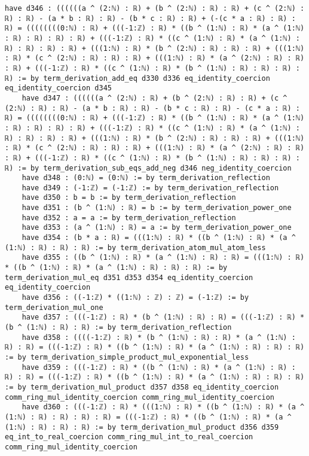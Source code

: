 \documentclass{article}
\begin{document}
\begin{tcolorbox}[colback=white!10, width=\linewidth]
\begin{lstlisting}[language=Lean4]
    have d346 : ((((((a ^ (2:ℕ) : ℝ) + (b ^ (2:ℕ) : ℝ) : ℝ) + (c ^ (2:ℕ) : ℝ) : ℝ) - (a * b : ℝ) : ℝ) - (b * c : ℝ) : ℝ) + (-(c * a : ℝ) : ℝ) : ℝ) = ((((((((0:ℕ) : ℝ) + (((-1:ℤ) : ℝ) * ((b ^ (1:ℕ) : ℝ) * (a ^ (1:ℕ) : ℝ) : ℝ) : ℝ) : ℝ) + (((-1:ℤ) : ℝ) * ((c ^ (1:ℕ) : ℝ) * (a ^ (1:ℕ) : ℝ) : ℝ) : ℝ) : ℝ) + (((1:ℕ) : ℝ) * (b ^ (2:ℕ) : ℝ) : ℝ) : ℝ) + (((1:ℕ) : ℝ) * (c ^ (2:ℕ) : ℝ) : ℝ) : ℝ) + (((1:ℕ) : ℝ) * (a ^ (2:ℕ) : ℝ) : ℝ) : ℝ) + (((-1:ℤ) : ℝ) * ((c ^ (1:ℕ) : ℝ) * (b ^ (1:ℕ) : ℝ) : ℝ) : ℝ) : ℝ) := by term_derivation_add_eq d330 d336 eq_identity_coercion eq_identity_coercion d345
    have d347 : ((((((a ^ (2:ℕ) : ℝ) + (b ^ (2:ℕ) : ℝ) : ℝ) + (c ^ (2:ℕ) : ℝ) : ℝ) - (a * b : ℝ) : ℝ) - (b * c : ℝ) : ℝ) - (c * a : ℝ) : ℝ) = ((((((((0:ℕ) : ℝ) + (((-1:ℤ) : ℝ) * ((b ^ (1:ℕ) : ℝ) * (a ^ (1:ℕ) : ℝ) : ℝ) : ℝ) : ℝ) + (((-1:ℤ) : ℝ) * ((c ^ (1:ℕ) : ℝ) * (a ^ (1:ℕ) : ℝ) : ℝ) : ℝ) : ℝ) + (((1:ℕ) : ℝ) * (b ^ (2:ℕ) : ℝ) : ℝ) : ℝ) + (((1:ℕ) : ℝ) * (c ^ (2:ℕ) : ℝ) : ℝ) : ℝ) + (((1:ℕ) : ℝ) * (a ^ (2:ℕ) : ℝ) : ℝ) : ℝ) + (((-1:ℤ) : ℝ) * ((c ^ (1:ℕ) : ℝ) * (b ^ (1:ℕ) : ℝ) : ℝ) : ℝ) : ℝ) := by term_derivation_sub_eqs_add_neg d346 neg_identity_coercion
    have d348 : (0:ℕ) = (0:ℕ) := by term_derivation_reflection
    have d349 : (-1:ℤ) = (-1:ℤ) := by term_derivation_reflection
    have d350 : b = b := by term_derivation_reflection
    have d351 : (b ^ (1:ℕ) : ℝ) = b := by term_derivation_power_one
    have d352 : a = a := by term_derivation_reflection
    have d353 : (a ^ (1:ℕ) : ℝ) = a := by term_derivation_power_one
    have d354 : (b * a : ℝ) = (((1:ℕ) : ℝ) * ((b ^ (1:ℕ) : ℝ) * (a ^ (1:ℕ) : ℝ) : ℝ) : ℝ) := by term_derivation_atom_mul_atom_less
    have d355 : ((b ^ (1:ℕ) : ℝ) * (a ^ (1:ℕ) : ℝ) : ℝ) = (((1:ℕ) : ℝ) * ((b ^ (1:ℕ) : ℝ) * (a ^ (1:ℕ) : ℝ) : ℝ) : ℝ) := by term_derivation_mul_eq d351 d353 d354 eq_identity_coercion eq_identity_coercion
    have d356 : ((-1:ℤ) * ((1:ℕ) : ℤ) : ℤ) = (-1:ℤ) := by term_derivation_mul_one
    have d357 : (((-1:ℤ) : ℝ) * (b ^ (1:ℕ) : ℝ) : ℝ) = (((-1:ℤ) : ℝ) * (b ^ (1:ℕ) : ℝ) : ℝ) := by term_derivation_reflection
    have d358 : ((((-1:ℤ) : ℝ) * (b ^ (1:ℕ) : ℝ) : ℝ) * (a ^ (1:ℕ) : ℝ) : ℝ) = (((-1:ℤ) : ℝ) * ((b ^ (1:ℕ) : ℝ) * (a ^ (1:ℕ) : ℝ) : ℝ) : ℝ) := by term_derivation_simple_product_mul_exponential_less
    have d359 : (((-1:ℤ) : ℝ) * ((b ^ (1:ℕ) : ℝ) * (a ^ (1:ℕ) : ℝ) : ℝ) : ℝ) = (((-1:ℤ) : ℝ) * ((b ^ (1:ℕ) : ℝ) * (a ^ (1:ℕ) : ℝ) : ℝ) : ℝ) := by term_derivation_mul_product d357 d358 eq_identity_coercion comm_ring_mul_identity_coercion comm_ring_mul_identity_coercion
    have d360 : (((-1:ℤ) : ℝ) * (((1:ℕ) : ℝ) * ((b ^ (1:ℕ) : ℝ) * (a ^ (1:ℕ) : ℝ) : ℝ) : ℝ) : ℝ) = (((-1:ℤ) : ℝ) * ((b ^ (1:ℕ) : ℝ) * (a ^ (1:ℕ) : ℝ) : ℝ) : ℝ) := by term_derivation_mul_product d356 d359 eq_int_to_real_coercion comm_ring_mul_int_to_real_coercion comm_ring_mul_identity_coercion

\end{lstlisting}
\end{tcolorbox}
\end{document}
